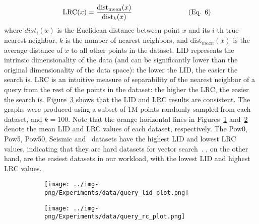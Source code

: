 \begin{equation}
\hspace{1.3cm}
\text{LRC}(x) = \frac{\text{dist}_{\text{mean}}(x)}{\text{dist}_k(x)}
\hspace{2.8cm} (\text{Eq. 6}) \tag*{}
\end{equation}
where $dist_i(x)$ is the Euclidean distance between point $x$ and its $i$-th true nearest neighbor, $k$ is the number of nearest neighbors, and $\text{dist}_{mean}(x)$ is the average distance of $x$ to all other points in the dataset.
LID represents the intrinsic dimensionality of the data
(and can be significantly lower than the original dimensionality of the data space): the lower the LID, the easier the search is.
LRC is an intuitive measure of separability of the nearest neighbor of a query from the rest of the points in the dataset: the higher the LRC, the easier the search is. Figure~\ref{fig:datacomp} shows that the LID and LRC results are consistent. The graphs were produced using a subset of 1M points randomly sampled from each dataset, and $k=100$. 
Note that the orange horizontal lines in Figures~\ref{fig:datacomp:lid} and~\ref{fig:datacomp:rc} denote the mean LID and LRC values of each dataset, respectively. %
The Pow0, Pow5, Pow50, Seismic and ~datasets have the highest LID and lowest LRC values, indicating that they are hard datasets for vector search~\cite{DBLP:journals/is/AumullerC21}. 
, on the other hand, are the easiest datasets in our workload, with the lowest LID and highest LRC values.


\begin{figure}[htb]
    \centering
    \begin{subfigure}{0.39\columnwidth}
    \centering
			\captionsetup{justification=centering}	
        \texttt{[image: ../img-png/Experiments/data/query\_lid\_plot.png]}
        \caption{}
        \label{fig:datacomp:lid}
    \end{subfigure}
    \hspace{1cm}
    \begin{subfigure}{0.39\columnwidth}
    \centering
			\captionsetup{justification=centering}	
        \texttt{[image: ../img-png/Experiments/data/query\_rc\_plot.png]}
        \caption{}
        \label{fig:datacomp:rc}
    \end{subfigure}
    \caption{}
    \label{fig:datacomp}
\end{figure}



